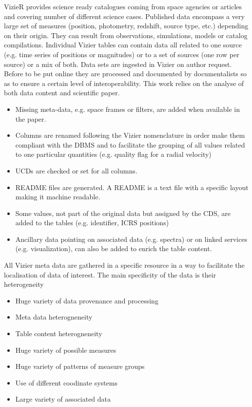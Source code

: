 \documentclass[11pt,a4paper]{ivoa}
\begin{document}
%
VizieR provides science ready catalogues coming from space agencies or articles and covering number of different science cases. 
Published data encompass a very large set of measures (position, photometry, redshift, source type, etc.) depending on their origin. 
They can result from  observations, simulations, models or catalog compilations.
Individual Vizier tables can contain data all related to one source (e.g. time series of positions or magnitudes) or to a set of sources (one row per source) or a mix of both.  
%
Data sets are ingested in Vizier on author request. Before to be put online they are processed and documented by documentalists so as to ensure a certain level of interoperability.
This work relies on the analyse of both data content and scientific paper.
\begin{itemize}
\item Missing meta-data, e.g. space frames or filters, are added when available in the paper.
\item Columns are renamed following the Vizier nomenclature in order make them compliant with the DBMS and to facilitate the grouping of all values related to one particular quantities (e.g. quality flag for a radial velocity)
\item UCDs are checked or set for all columns.
\item README files are generated. A README is a text file with a specific layout making it machine readable.
\item Some values, not part of the original data but assigned by the CDS, are added to the tables (e.g. identifier, ICRS positions)  
\item Ancillary data pointing on associated data (e.g.  spectra) or on linked services (e.g. visualization), can also be added to enrich the table content.  
\end{itemize}

All Vizier meta data are gathered in a specific resource in a way to facilitate the localisation of data of interest.
The main specificity of the data is their heterogeneity 
\begin{itemize}
\item Huge variety of data provenance and processing 
\item Meta data heterogneneity
\item Table content heterogneneity
\item Huge variety of possible measures
\item Huge variety of patterns of measure groups
\item Use of different coodinate systems 
\item Large variety of associated data
\end{itemize}
\end{document}
